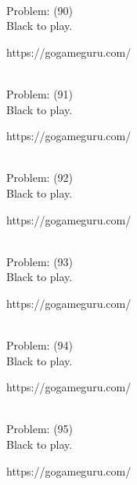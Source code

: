 \documentclass[11pt]{article}
\begin{document}
\begin{minipage}[t]{0.5\textwidth}
  {\centering
  
\\
Problem: (90)\\
Black to play.

https://gogameguru.com/\\
  }
\end{minipage}
\begin{minipage}[t]{0.5\textwidth}
  {\centering
  
\\
Problem: (91)\\
Black to play.

https://gogameguru.com/\\
  }
\end{minipage}
\begin{minipage}[t]{0.5\textwidth}
  {\centering
  
\\
Problem: (92)\\
Black to play.

https://gogameguru.com/\\
  }
\end{minipage}
\begin{minipage}[t]{0.5\textwidth}
  {\centering
  
\\
Problem: (93)\\
Black to play.

https://gogameguru.com/\\
  }
\end{minipage}
\begin{minipage}[t]{0.5\textwidth}
  {\centering
  
\\
Problem: (94)\\
Black to play.

https://gogameguru.com/\\
  }
\end{minipage}
\begin{minipage}[t]{0.5\textwidth}
  {\centering
  
\\
Problem: (95)\\
Black to play.

https://gogameguru.com/\\
  }
\end{minipage}
\end{document}
